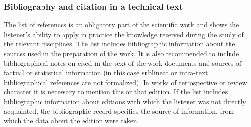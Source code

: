 \documentclass[10pt, twoside, slovak,a4paper]{article}
\begin{document}
\subsubsection{Bibliography and citation in a technical text}
The list of references is an obligatory part of the scientific work and shows the listener's ability to apply in practice the knowledge received during the study of the relevant disciplines.
The list includes bibliographic information about the sources used in the preparation of the work.
It is also recommended to include bibliographical notes on cited in the text of the work documents and sources of factual or statistical information (in this case sublinear or intra-text bibliographical references are not formalized).
In works of retrospective or review character it is necessary to mention this or that edition. If the list includes bibliographic information about editions with which the listener was not directly acquainted, the bibliographic record specifies the source of information, from which the data about the edition were taken.\\


 
\end{document}
